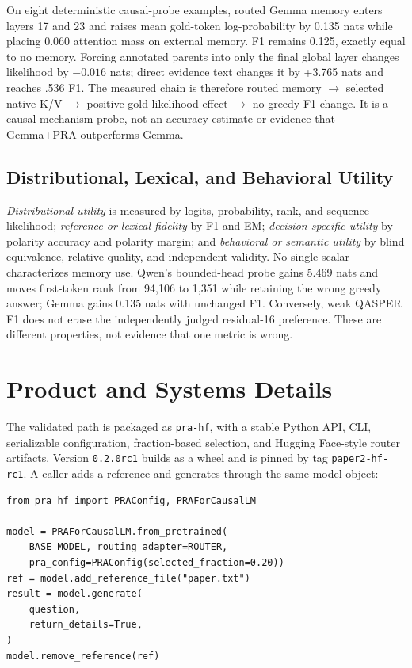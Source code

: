 \documentclass[11pt]{article}
\begin{document}
On eight deterministic causal-probe examples, routed Gemma memory enters layers 17 and 23 and
raises mean gold-token log-probability by 0.135 nats while placing 0.060 attention mass on
external memory. F1 remains 0.125, exactly equal to no memory. Forcing annotated parents into only
the final global layer changes likelihood by $-0.016$ nats; direct evidence text changes it by
+3.765 nats and reaches .536 F1. The measured chain is therefore routed memory $\rightarrow$
selected native K/V $\rightarrow$ positive gold-likelihood effect $\rightarrow$ no greedy-F1
change. It is a causal mechanism probe, not an accuracy estimate or evidence that Gemma+PRA
outperforms Gemma.

\subsection{Distributional, Lexical, and Behavioral Utility}

\emph{Distributional utility} is measured by logits, probability, rank, and sequence likelihood;
\emph{reference or lexical fidelity} by F1 and EM; \emph{decision-specific utility} by polarity
accuracy and polarity margin; and \emph{behavioral or semantic utility} by blind equivalence,
relative quality, and independent validity. No single scalar characterizes memory use. Qwen's
bounded-head probe gains 5.469 nats and moves first-token rank from 94,106 to 1,351 while retaining
the wrong greedy answer; Gemma gains 0.135 nats with unchanged F1. Conversely, weak QASPER F1 does
not erase the independently judged residual-16 preference. These are different properties, not
evidence that one metric is wrong.


\section{Product and Systems Details}
\label{app:product-details}

The validated path is packaged as \texttt{pra-hf}, with a stable Python API, CLI, serializable
configuration, fraction-based selection, and Hugging Face-style router artifacts. Version
\texttt{0.2.0rc1} builds as a wheel and is pinned by tag \texttt{paper2-hf-rc1}. A caller adds a
reference and generates through the same model object:

\begin{verbatim}
from pra_hf import PRAConfig, PRAForCausalLM

model = PRAForCausalLM.from_pretrained(
    BASE_MODEL, routing_adapter=ROUTER,
    pra_config=PRAConfig(selected_fraction=0.20))
ref = model.add_reference_file("paper.txt")
result = model.generate(
    question,
    return_details=True,
)
model.remove_reference(ref)
\end{verbatim}
\end{document}
